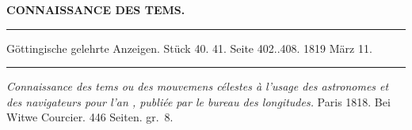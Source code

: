 \clearpage
\begingroup
\pagestyle{empty}
\thispagestyle{empty}
\noindent\makebox[10mm][l]{}%
\parbox[b]{\dimexpr\textwidth-20mm\relax}{\centering\small\textbf{CONNAISSANCE DES TEMS.}}%
\par\nobreak\medskip
\begin{center}
\parbox{.92\linewidth}{\centering\small
\rule{\linewidth}{.3pt}\par\smallskip
Göttingische gelehrte Anzeigen. Stück 40. 41. Seite 402..408. 1819 März 11.\par\smallskip
\rule{\linewidth}{.3pt}}
\end{center}
\par\medskip

\noindent\emph{Connaissance des tems ou des mouvemens célestes à l'usage des astronomes et des navigateurs pour l'an {}, publiée par le bureau des longitudes.} Paris 1818. Bei Witwe Courcier. 446 Seiten. gr.~8.

